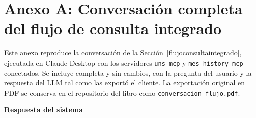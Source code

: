 \section*{Anexo A: Conversación completa del flujo de consulta integrado}
{}
\makeatletter{}\makeatother
\label{anexo:conversacion_flujo}

Este anexo reproduce la conversación de la Sección~\ref{flujoconsultaintegrado}, ejecutada en Claude Desktop con los servidores \texttt{uns-mcp} y \texttt{mes-history-mcp} conectados. Se incluye completa y sin cambios, con la pregunta del usuario y la respuesta del LLM tal como las exportó el cliente. La exportación original en PDF se conserva en el repositorio del libro como \texttt{conversacion\_flujo.pdf}.


\noindent\textbf{Respuesta del sistema}\par\smallskip

